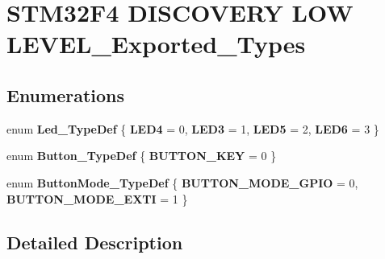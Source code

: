 \hypertarget{group___s_t_m32_f4___d_i_s_c_o_v_e_r_y___l_o_w___l_e_v_e_l___exported___types}{}\section{S\+T\+M32\+F4 D\+I\+S\+C\+O\+V\+E\+RY L\+OW L\+E\+V\+E\+L\+\_\+\+Exported\+\_\+\+Types}
\label{group___s_t_m32_f4___d_i_s_c_o_v_e_r_y___l_o_w___l_e_v_e_l___exported___types}
\subsection*{Enumerations}
\begin{DoxyCompactItemize}
\item 
\mbox{\label{group___s_t_m32_f4___d_i_s_c_o_v_e_r_y___l_o_w___l_e_v_e_l___exported___types_gaa059704b7ca945eb9c1e7f2c3d03fecd}} 
enum {\bfseries Led\+\_\+\+Type\+Def} \{ {\bfseries L\+E\+D4} = 0, 
{\bfseries L\+E\+D3} = 1, 
{\bfseries L\+E\+D5} = 2, 
{\bfseries L\+E\+D6} = 3
 \}
\item 
\mbox{\label{group___s_t_m32_f4___d_i_s_c_o_v_e_r_y___l_o_w___l_e_v_e_l___exported___types_ga643816dfbad5c734fc25a29ce8d35bb1}} 
enum {\bfseries Button\+\_\+\+Type\+Def} \{ {\bfseries B\+U\+T\+T\+O\+N\+\_\+\+K\+EY} = 0
 \}
\item 
\mbox{\label{group___s_t_m32_f4___d_i_s_c_o_v_e_r_y___l_o_w___l_e_v_e_l___exported___types_ga48825b7c7d851c440ef8e808fd9d8f0a}} 
enum {\bfseries Button\+Mode\+\_\+\+Type\+Def} \{ {\bfseries B\+U\+T\+T\+O\+N\+\_\+\+M\+O\+D\+E\+\_\+\+G\+P\+IO} = 0, 
{\bfseries B\+U\+T\+T\+O\+N\+\_\+\+M\+O\+D\+E\+\_\+\+E\+X\+TI} = 1
 \}
\end{DoxyCompactItemize}


\subsection{Detailed Description}
